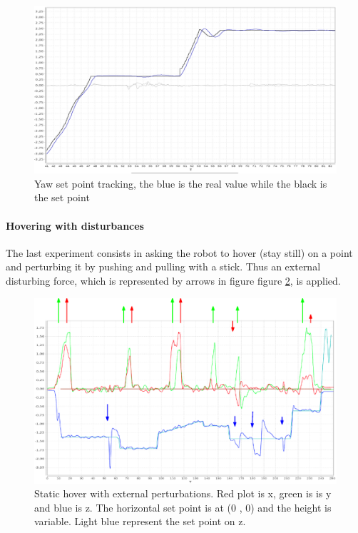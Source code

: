 \begin{figure}[H]
	\centering
	\noindent
	\includegraphics[width=1\textwidth]{yaw_conv.png}
	\caption[Yaw tracking]{Yaw set point tracking, the blue is the real value while the black is the set point}
	\label{figure:yawconv}
\end{figure}

\noindent
\paragraph{Hovering with disturbances}
The last experiment consists in asking the robot to hover (stay still) on a point and perturbing it by pushing and pulling with a stick. Thus an external disturbing force, which is represented by arrows in figure figure \ref{figure:hover}, is applied.

\begin{figure}[H]
	\centering
	\noindent
	\includegraphics[width=1\textwidth]{perturbation2.eps}
	\caption[Static hover with external perturbations]{Static hover with external perturbations. Red plot is x, green is is y and blue is z. The horizontal set point is at (0 , 0) and the height is variable. Light blue represent the set point on z.}
	\label{figure:hover}
\end{figure}












